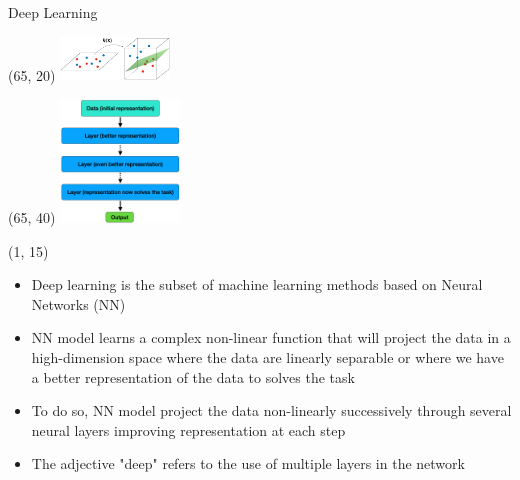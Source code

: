   \begin{frame}{Deep Learning}  

    \begin{textblock}{40}(65, 20)
        \includegraphics[width=110px]{img/projection.png}
    \end{textblock}
    \begin{textblock}{40}(65, 40)
      \includegraphics[width=120px]{img/projection_dl.png}
    \end{textblock}

    
    \begin{textblock}{60}(1, 15)
        \begin{itemize}
            \item Deep learning is the subset of machine learning methods based on Neural Networks (NN)
            \item NN model learns a complex non-linear function that will project the data in a high-dimension space where the data are linearly separable or where we have a better representation of the data to solves the task
            \item To do so, NN model project the data non-linearly successively through several neural layers improving representation at each step
            \item The adjective "deep" refers to the use of multiple layers in the network
          \end{itemize}
    \end{textblock}
  
  
  \end{frame}

